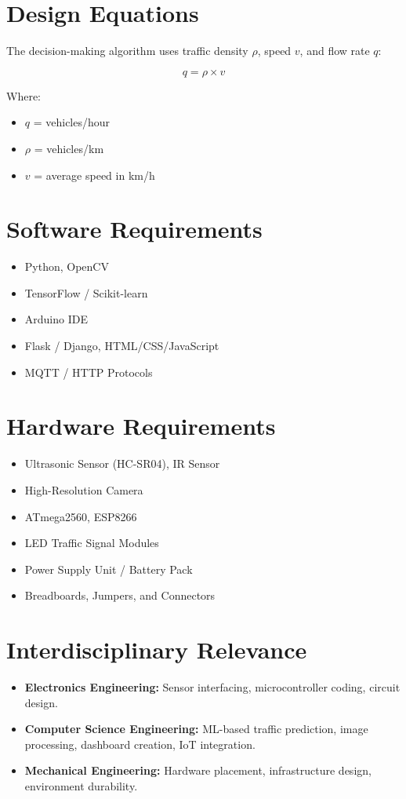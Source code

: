 \documentclass[12pt]{report}
\begin{document}
\section{Design Equations}
The decision-making algorithm uses traffic density $\rho$, speed $v$, and flow rate $q$:

\begin{equation}
q = \rho \times v
\end{equation}

Where:
\begin{itemize}
\item $q$ = vehicles/hour
\item $\rho$ = vehicles/km
\item $v$ = average speed in km/h
\end{itemize}

\section{Software Requirements}
\begin{itemize}
\item Python, OpenCV
\item TensorFlow / Scikit-learn
\item Arduino IDE
\item Flask / Django, HTML/CSS/JavaScript
\item MQTT / HTTP Protocols
\end{itemize}

\section{Hardware Requirements}
\begin{itemize}
\item Ultrasonic Sensor (HC-SR04), IR Sensor
\item High-Resolution Camera
\item ATmega2560, ESP8266
\item LED Traffic Signal Modules
\item Power Supply Unit / Battery Pack
\item Breadboards, Jumpers, and Connectors
\end{itemize}

\section{Interdisciplinary Relevance}
\begin{itemize}
\item \textbf{Electronics Engineering:} Sensor interfacing, microcontroller coding, circuit design.
\item \textbf{Computer Science Engineering:} ML-based traffic prediction, image processing, dashboard creation, IoT integration.
\item \textbf{Mechanical Engineering:} Hardware placement, infrastructure design, environment durability.
\end{itemize}
\end{document}
